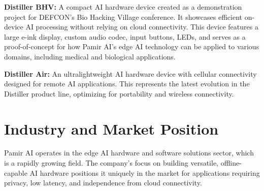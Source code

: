 \documentclass[12pt,a4paper]{report}
\begin{document}
\vspace{0.3cm}

\textbf{Distiller BHV:} A compact AI hardware device created as a demonstration project for DEFCON's Bio Hacking Village conference. It showcases efficient on-device AI processing without relying on cloud connectivity. This device features a large e-ink display, custom audio codec, input buttons, LEDs, and serves as a proof-of-concept for how Pamir AI's edge AI technology can be applied to various domains, including medical and biological applications.

\vspace{0.3cm}

\textbf{Distiller Air:} An ultralightweight AI hardware device with cellular connectivity designed for remote AI applications. This represents the latest evolution in the Distiller product line, optimizing for portability and wireless connectivity.


\vspace{0.5cm}


\vspace{0.5cm}


\section{Industry and Market Position}

Pamir AI operates in the edge AI hardware and software solutions sector, which is a rapidly growing field. The company's focus on building versatile, offline-capable AI hardware positions it uniquely in the market for applications requiring privacy, low latency, and independence from cloud connectivity.
\end{document}
